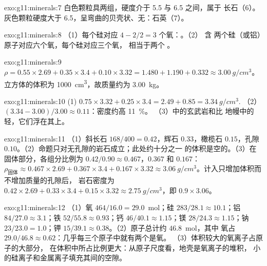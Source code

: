 \begin{solution}{exo:g11:minerals:7}
白色颗粒具两组，硬度介于 5.5 与 6.5 之间，属于
长石（6）。灰色颗粒硬度大于 6.5，呈弯曲的贝壳状、无：石英（7）。
%
\end{solution}

\begin{solution}{exo:g11:minerals:8}
（1）每个硅对应 $4 - 2/2 = 3$ 个氧：。（2） 含
两个硅（或铝）原子对应六个氧，每个硅对应三个氧，
相当于两个 。
\end{solution}

\begin{solution}{exo:g11:minerals:9}
$\rho = 0.55 \times 2.69 + 0.35 \times 3.4 + 0.10 \times 3.32 = 1.480 + 1.190
+ 0.332 \approx \qty{3.00}{g/cm^3}$。立方体的体积为
\qty{1000}{cm^3}，故质量约为 \qty{3.00}{kg}。
\end{solution}

\begin{solution}{exo:g11:minerals:10}
(1) $0.75 \times 3.32 + 0.25 \times 3.4 = 2.49 + 0.85 = \qty{3.34}{g/cm^3}$.
（2）$(3.34 - 3.00)/3.00 \approx 0.11$：密度约高 \qty{11}{\percent}。
（3）中的玄武岩和比
地幔中的轻，它们浮在其上。
\end{solution}

\begin{solution}{exo:g11:minerals:11}
（1）斜长石 $168/400 = 0.42$，辉石 $0.33$，橄榄石 $0.15$，孔隙
$0.10$。（2）命题只对无孔隙的岩石成立；此处约十分之一
的体积是空的。（3）在固体部分，各组分比例为 $0.42/0.90
\approx 0.467$，$0.367$ 和 $0.167$：
$\rho_{\text{固体}} \approx 0.467 \times 2.69 + 0.367 \times 3.4 + 0.167
\times 3.32 \approx \qty{3.06}{g/cm^3}$。计入只增加体积而不增加质量的孔隙后，
岩石密度为 $0.42 \times 2.69 + 0.33 \times 3.4 +
0.15 \times 3.32 \approx \qty{2.75}{g/cm^3}$，即 $0.9 \times 3.06$。
\end{solution}

\begin{solution}{exo:g11:minerals:12}
（1）氧 $464/16.0 = 29.0$~mol；硅 $283/28.1 \approx 10.1$；铝
$84/27.0 \approx 3.1$；铁 $52/55.8 \approx 0.93$；钙 $46/40.1 \approx
1.15$；镁 $28/24.3 \approx 1.15$；钠 $23/23.0 = 1.0$；钾
$15/39.1 \approx 0.38$。（2）原子总计约 $46.8$~mol，其中
氧占 $29.0/46.8 \approx 0.62$：几乎每三个原子中就有两个是氧。
（3）体积较大的氧离子占原子的大部分，
在体积中所占比例更大：从原子尺度看，地壳是氧离子的堆积，
小的硅离子和金属离子填充其间的空隙。
\end{solution}


